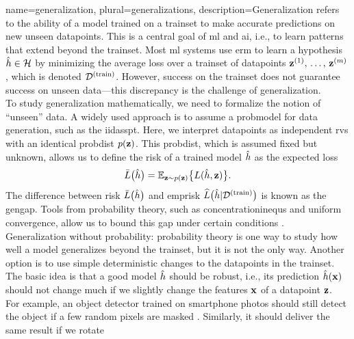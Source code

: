 {name={generalization}, plural={generalizations}, 
	description={Generalization refers to the ability of a \gls{model} trained on a \gls{trainset} to make accurate 
		\glspl{prediction} on new unseen \glspl{datapoint}. This is a central goal of \gls{ml} and \gls{ai}, i.e., 
		to learn patterns that extend beyond the \gls{trainset}. Most \gls{ml} systems 
		use \gls{erm} to learn a \gls{hypothesis} $\hat{h} \in \mathcal{H}$ by minimizing 
		the average \gls{loss} over a \gls{trainset} of \glspl{datapoint} ${\bf z}^{(1)}, \,\ldots, \,{\bf z}^{(m)}$, 
		which is denoted $\mathcal{D}^{(\rm train)}$. However, success on the \gls{trainset} does not guarantee success on 
		unseen \gls{data}—this discrepancy is the challenge of generalization. \\ To study generalization 
		mathematically, we need to formalize the notion of ``unseen'' \gls{data}. A widely used 
		approach is to assume a \gls{probmodel} for \gls{data} generation, such as the \gls{iidasspt}. 
		Here, we interpret \glspl{datapoint} as independent \glspl{rv} with an identical 
		\gls{probdist} $p({\bf z})$. This \gls{probdist}, which is assumed fixed but unknown, 
		allows us to define the \gls{risk} of a trained \gls{model} $\hat{h}$ as the expected \gls{loss}
		\[
		\bar{L} \big( \hat{h} \big)=\mathbb{E}_{{\bf z} \sim p({\bf z})} \big\{ L(\hat{h}, {\bf z}) \big\}.
		\]
		The difference between \gls{risk} $\bar{L} \big( \hat{h} \big)$ and \gls{emprisk} $\widehat{L}\big(\hat{h}|\mathcal{D}^{(\rm train)}\big)$ 
		is known as the \gls{gengap}. Tools from \gls{probability} theory, such as \glspl{concentrationinequ} 
		and uniform convergence, allow us to bound this gap under certain conditions \cite{ShalevMLBook}.\\
		Generalization without \gls{probability}: \Gls{probability} theory is one way to study how well a 
		\gls{model} generalizes beyond the \gls{trainset}, but it is not the only way. Another option is to use 
		simple deterministic changes to the \glspl{datapoint} in the \gls{trainset}. The basic idea is that a 
		good \gls{model} $\hat{h}$ should be robust, i.e., its \gls{prediction} $\hat{h}({\bf x})$ 
		should not change much if we slightly change the \glspl{feature} ${\bf x}$ of a \gls{datapoint} ${\bf z}$. 
		\\[1mm] For example, an object detector trained on smartphone photos should still detect the object if a few 
		random pixels are masked \cite{OnePixelAttack}. Similarly, it should deliver the same result if we rotate 
}}
